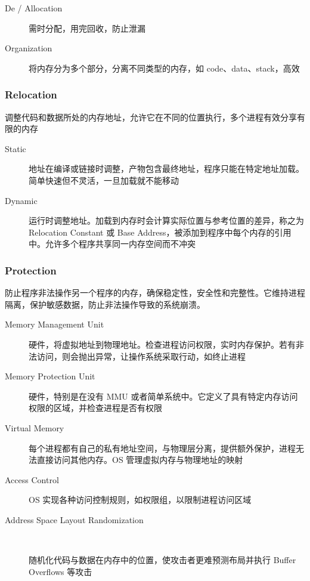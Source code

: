 \documentclass[11pt,journal,compsoc]{IEEEtran}
\begin{document}
\begin{description}
    \item[De / Allocation] 需时分配，用完回收，防止泄漏

    \item[Organization] 将内存分为多个部分，分离不同类型的内存，如 code、data、stack，高效
\end{description}


\subsubsection{Relocation}

调整代码和数据所处的内存地址，允许它在不同的位置执行，多个进程有效分享有限的内存

\begin{description}
    \item[Static] 地址在编译或链接时调整，产物包含最终地址，程序只能在特定地址加载。简单快速但不灵活，一旦加载就不能移动

    \item[Dynamic] 运行时调整地址。加载到内存时会计算实际位置与参考位置的差异，称之为 Relocation Constant 或 Base Address，被添加到程序中每个内存的引用中。允许多个程序共享同一内存空间而不冲突
\end{description}


\subsubsection{Protection}

防止程序非法操作另一个程序的内存，确保稳定性，安全性和完整性。它维持进程隔离，保护敏感数据，防止非法操作导致的系统崩溃。

\begin{description}
    \item[Memory Management Unit] 硬件，将虚拟地址到物理地址。检查进程访问权限，实时内存保护。若有非法访问，则会抛出异常，让操作系统采取行动，如终止进程

    \item[Memory Protection Unit] 硬件，特别是在没有 MMU 或者简单系统中。它定义了具有特定内存访问权限的区域，并检查进程是否有权限

    \item[Virtual Memory] 每个进程都有自己的私有地址空间，与物理层分离，提供额外保护，进程无法直接访问其他内存。OS 管理虚拟内存与物理地址的映射

    \item[Access Control] OS 实现各种访问控制规则，如权限组，以限制进程访问区域

    \item[Address Space Layout Randomization] ~
    
    随机化代码与数据在内存中的位置，使攻击者更难预测布局并执行 Buffer Overflows 等攻击
\end{description}
\end{document}
